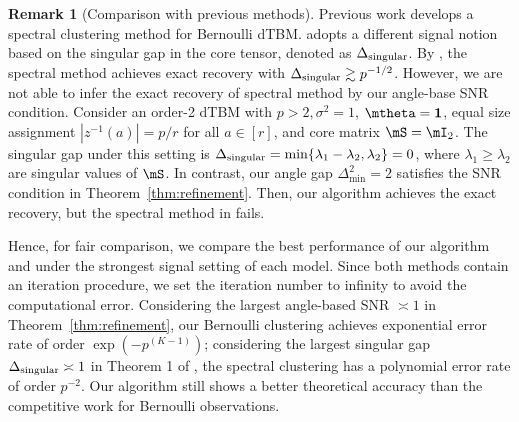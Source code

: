 \documentclass[lettersize,onecolumn,journal]{IEEEtran}
\theoremstyle{definition}
\theoremstyle{definition}
\newtheorem{rmk}{Remark}
\begin{document}
{\begin{itemize}[wide]
{\begin{rmk}[Comparison with previous methods]  Previous work \citep{ke2019community} develops a spectral clustering method for Bernoulli dTBM. \cite{ke2019community} adopts a different signal notion based on the singular gap in the core tensor, denoted as $\Delta_{\rm singular}$. By \citet[Theorem 1]{ke2019community}, the spectral method achieves exact recovery with $\Delta_{\rm singular} \gtrsim p^{-1/2}$. However, we are not able to infer the exact recovery of spectral method by our angle-base SNR condition. Consider an order-2 dTBM with $p > 2, \sigma^2 = 1$, $\mtheta = \mathbf{1}$, equal size assignment $|z^{-1}(a)| = p/r$ for all $ a \in [r]$, and core matrix $\mS = \mI_2$. The singular gap under this setting is $\Delta_{\rm singular} = \min\{ \lambda_1 - \lambda_2, \lambda_2 \} = 0$, where $\lambda_1 \geq \lambda_2$ are singular values of $\mS$. In contrast, our angle gap $\Delta_{\min}^2 = 2$ satisfies the SNR condition in Theorem~\ref{thm:refinement}. Then, our algorithm achieves the exact recovery, but the spectral method in \cite{ke2019community} fails.

Hence, for fair comparison, we compare the best performance of our algorithm and \cite{ke2019community} under the strongest signal setting of each model. Since both methods contain an iteration procedure, we set the iteration number to infinity to avoid the computational error. Considering the largest angle-based SNR $\asymp 1$ in Theorem~\ref{thm:refinement}, our Bernoulli clustering achieves exponential error rate of order $\exp(-p^{(K-1)})$; considering the largest singular gap $\Delta_{\rm singular} \asymp 1$ in Theorem 1 of \cite{ke2019community}, the spectral clustering has a polynomial error rate of order $p^{-2}$. Our algorithm still shows a better theoretical accuracy than the competitive work for Bernoulli observations. 
\end{rmk}



}
\end{itemize}}
\end{document}

